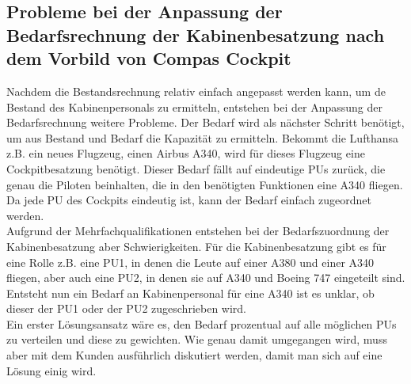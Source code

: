 \documentclass [12pt, a4paper, oneside, titlepage, ngerman]{article}
\begin{document}
\subsection{Probleme bei der Anpassung der Bedarfsrechnung der Kabinenbesatzung nach dem Vorbild von Compas Cockpit}
Nachdem die Bestandsrechnung relativ einfach angepasst werden kann, um de Bestand des Kabinenpersonals zu ermitteln, entstehen bei der Anpassung der Bedarfsrechnung weitere Probleme. Der Bedarf wird als nächster Schritt benötigt, um aus Bestand und Bedarf die Kapazität zu ermitteln. Bekommt die Lufthansa z.B. ein neues Flugzeug, einen Airbus A340, wird für dieses Flugzeug eine Cockpitbesatzung benötigt. Dieser Bedarf fällt auf eindeutige \acp{PU} zurück, die genau die Piloten beinhalten, die in den benötigten Funktionen eine A340 fliegen. Da jede \ac{PU} des Cockpits eindeutig ist, kann der Bedarf einfach zugeordnet werden. \\
Aufgrund der Mehrfachqualifikationen entstehen bei der Bedarfszuordnung der Kabinenbesatzung aber Schwierigkeiten. Für die Kabinenbesatzung gibt es für eine Rolle z.B. eine \ac{PU}1, in denen die Leute auf einer A380 und einer A340 fliegen, aber auch eine \ac{PU}2, in denen sie auf A340 und Boeing 747 eingeteilt sind. Entsteht nun ein Bedarf an Kabinenpersonal für eine A340 ist es unklar, ob dieser der \ac{PU}1 oder der \ac{PU}2 zugeschrieben wird. \\
Ein erster Lösungsansatz wäre es, den Bedarf prozentual auf alle möglichen \acp{PU} zu verteilen und diese zu gewichten. Wie genau damit umgegangen wird, muss aber mit dem Kunden ausführlich diskutiert werden, damit man sich auf eine Lösung einig wird.
\end{document}
